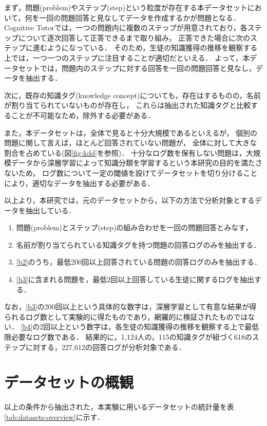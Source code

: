 まず，問題(problem)やステップ(step)という粒度が存在する本データセットにおいて，何を一回の問題回答と見なしてデータを作成するかが問題となる．
Cognitive Tutorでは，一つの問題内に複数のステップが用意されており，各ステップについて逐次回答して正答できるまで取り組み，
正答できた場合に次のステップに進むようになっている．
そのため，生徒の知識獲得の推移を観察する上では，一つ一つのステップに注目することが適切だといえる．
よって，本データセットでは，問題内のステップに対する回答を一回の問題回答と見なし，データを抽出する．

次に，既存の知識タグ(knowledge concept)についても，存在はするものの，名前が割り当てられていないものが存在し，
これらは抽出された知識タグと比較することが不可能なため，除外する必要がある．
 
また，本データセットは，全体で見ると十分大規模であるといえるが，
個別の問題に関して言えば，ほとんど回答されていない問題が，
全体に対して大きな割合を占めている(図\ref{fig:kdd}を参照)．
十分なログ数を保有しない問題は，大規模データから深層学習によって知識分類を学習するという本研究の目的を満たさないため，
ログ数について一定の閾値を設けてデータセットを切り分けることにより，適切なデータを抽出する必要がある．


以上より，本研究では，元のデータセットから，以下の方法で分析対象とするデータを抽出している．
\begin{enumerate}
	\item 問題(problem)とステップ(step)の組み合わせを一回の問題回答とみなす，\label{b1}
	\item 名前が割り当てられている知識タグを持つ問題の回答ログのみを抽出する．\label{b2}
	\item \ref{b2}のうち，最低200回以上回答されている問題の回答ログのみを抽出する．\label{b3}
	\item \ref{b3}に含まれる問題を，最低2回以上回答している生徒に関するログを抽出する．\label{b4}
\end{enumerate}

なお，\ref{b3}の200回以上という具体的な数字は，深層学習として有意な結果が得られるログ数として実験的に得たものであり，網羅的に検証されたものではない．
\ref{b4}の2回以上という数字は，各生徒の知識獲得の推移を観察する上で最低限必要なログ数である．
結果的に，1,124人の，115の知識タグが紐づく618のステップに対する，227,612の回答ログが分析対象である．


\section{データセットの概観}
以上の条件から抽出された，本実験に用いるデータセットの統計量を表\ref{tab:datasets-overview}に示す．

